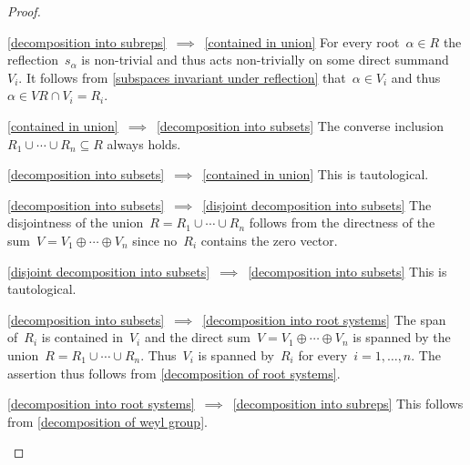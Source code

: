 \begin{proof}
  \leavevmode
  \begin{implicationlist}
    \item[\ref*{decomposition into subreps}~$\implies$~\ref*{contained in union}]
      For every root~$\alpha \in R$ the reflection~$s_\alpha$ is non-trivial and thus acts non-trivially on some direct summand~$V_i$.
      It follows from \cref{subspaces invariant under reflection} that~$\alpha \in V_i$ and thus~$\alpha \in V R \cap V_i = R_i$.
    \item[\ref*{contained in union}~$\implies$~\ref*{decomposition into subsets}]
      The converse inclusion~$R_1 \cup \dotsb \cup R_n \subseteq R$ always holds.
    \item[\ref*{decomposition into subsets}~$\implies$~\ref*{contained in union}]
      This is tautological.
    \item[\ref*{decomposition into subsets}~$\implies$~\ref*{disjoint decomposition into subsets}]
      The disjointness of the union~$R = R_1 \cup \dotsb \cup R_n$ follows from the directness of the sum~$V = V_1 \oplus \dotsb \oplus V_n$ since no~$R_i$ contains the zero vector.
    \item[\ref*{disjoint decomposition into subsets}~$\implies$~\ref*{decomposition into subsets}]
      This is tautological.
    \item[\ref*{decomposition into subsets}~$\implies$~\ref*{decomposition into root systems}]
      The span of~$R_i$ is contained in~$V_i$ and the direct sum~$V = V_1 \oplus \dotsb \oplus V_n$ is spanned by the union~$R = R_1 \cup \dotsb \cup R_n$.
      Thus~$V_i$ is spanned by~$R_i$ for every~$i = 1, \dotsc, n$.
      The assertion thus follows from \cref{decomposition of root systems}.
    \item[\ref*{decomposition into root systems}~$\implies$~\ref*{decomposition into subreps}]
      This follows from \cref{decomposition of weyl group}.
    \qedhere
  \end{implicationlist}
\end{proof}


